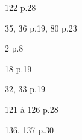 \documentclass[10pt,a4paper,openany,twoside]{book}
\begin{document}
		\begin{bookexo}{122 p.28 \train}\end{bookexo}

	\begin{bookexos}{35, 36 p.19, 80 p.23}\end{bookexos}

		\begin{bookact}{2 p.8}\end{bookact}
		\begin{bookexo}{18 p.19}\end{bookexo}
		\begin{bookexos}{32, 33 p.19}\end{bookexos}

		\begin{bookexos}{121 à 126 p.28}\end{bookexos}

		\begin{bookexos}{136, 137 p.30}\end{bookexos}


\end{document}
